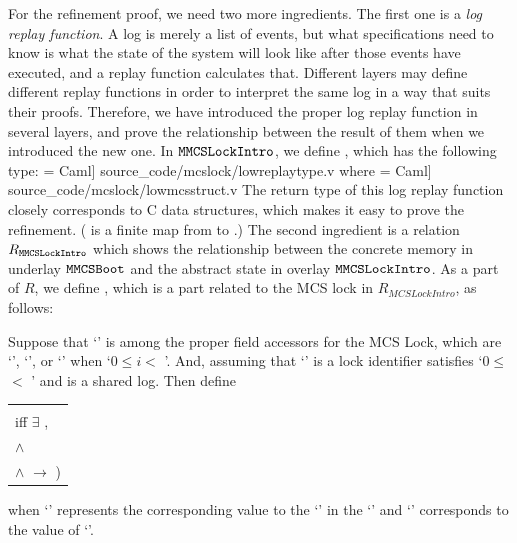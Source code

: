 For the refinement proof, we need two more ingredients.
The first one is a \emph{log replay function}.
A log is merely a list of events, but what specifications need to know is what the state of the system will look like after those events have executed,
and a replay function calculates that. 
Different layers may define different replay functions in order to interpret the same log in a way that suits their proofs.
Therefore, we have introduced the proper log replay function in several layers, and prove the relationship between the result of them when we introduced the new one.
In ${\mathrm{\texttt{MMCSLockIntro}}}$, we define , which has the following type:
 = Caml] {source_code/mcslock/lowreplaytype.v}
where
 = Caml] {source_code/mcslock/lowmcsstruct.v}
The return type of this log replay function closely corresponds to C data structures, which makes it easy to prove the refinement. ( is a finite map from  to .)
The second ingredient is a relation $R_{{\mathrm{\texttt{MMCSLockIntro}}}}$ which shows the relationship between the concrete memory in underlay ${\mathrm{\texttt{MMCSBoot}}}$ and the abstract state in overlay ${\mathrm{\texttt{MMCSLockIntro}}}$.
As a part of $R$, we define , which is a part related to 
the MCS lock in $R_{MCSLockIntro}$,  as follows:

\begin{definition}
Suppose that `' is among the proper field accessors for the MCS Lock, which are
`', `', or  `' when `$0 \leq i <$  '.
 And, assuming that `' is a lock identifier satisfies `$0 \leq$  $<$ ' and  is a shared log. Then define \newline
  \begin{tabular}{P{0.90\textwidth}}
    \\
      iff \code{(}$\exists$ , \\
       $\wedge$  \\
      $\wedge$  $\rightarrow$ )
\end{tabular}\newline
    when `' represents the corresponding 
    value to the `' in the `' 
    and `' corresponds to the value of `'.
\end{definition}

